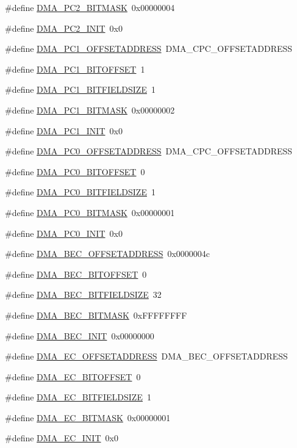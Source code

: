 \begin{DoxyCompactItemize}
\item 
\#define \hyperlink{a00547_a8bc6bf603200c5576041f5efb1bbb3fa}{DMA\_\-PC2\_\-BITMASK}~0x00000004
\item 
\#define \hyperlink{a00547_ae8f8f5cafa7cb5a3432330f6bd7c8545}{DMA\_\-PC2\_\-INIT}~0x0
\item 
\#define \hyperlink{a00547_a5bcf743628bf5a288525da9914231160}{DMA\_\-PC1\_\-OFFSETADDRESS}~DMA\_\-CPC\_\-OFFSETADDRESS
\item 
\#define \hyperlink{a00547_ab5d5d1413dcb4e0e265b75527d54b991}{DMA\_\-PC1\_\-BITOFFSET}~1
\item 
\#define \hyperlink{a00547_adc953b9a63b8aea304f5fd3c5a5b37c1}{DMA\_\-PC1\_\-BITFIELDSIZE}~1
\item 
\#define \hyperlink{a00547_a4aba948f4d1d8fbb5a006d0c6fd04f9c}{DMA\_\-PC1\_\-BITMASK}~0x00000002
\item 
\#define \hyperlink{a00547_afc2289327605fe02ebfeb946919fe5b5}{DMA\_\-PC1\_\-INIT}~0x0
\item 
\#define \hyperlink{a00547_a92fb05b33dcfaa49dc3e177695413b2f}{DMA\_\-PC0\_\-OFFSETADDRESS}~DMA\_\-CPC\_\-OFFSETADDRESS
\item 
\#define \hyperlink{a00547_a3d27bc23ca5e54a254421a73b26cdb19}{DMA\_\-PC0\_\-BITOFFSET}~0
\item 
\#define \hyperlink{a00547_aea542224fcd0fbadd5ab1ee3094c85da}{DMA\_\-PC0\_\-BITFIELDSIZE}~1
\item 
\#define \hyperlink{a00547_aba1f7f5aa23a474f5887516c98b26563}{DMA\_\-PC0\_\-BITMASK}~0x00000001
\item 
\#define \hyperlink{a00547_a8452ecb69e450977ef4360e923801cf6}{DMA\_\-PC0\_\-INIT}~0x0
\item 
\#define \hyperlink{a00547_ad80e0c9431c46cb3e1fde5b2297b8ed1}{DMA\_\-BEC\_\-OFFSETADDRESS}~0x0000004c
\item 
\#define \hyperlink{a00547_a57a67b1d0edc6422548771bdbc019af8}{DMA\_\-BEC\_\-BITOFFSET}~0
\item 
\#define \hyperlink{a00547_a5ae1e4fd1ad40538223e030c5e7c4f70}{DMA\_\-BEC\_\-BITFIELDSIZE}~32
\item 
\#define \hyperlink{a00547_a2becfaea83418cc2f99c46ebf387894f}{DMA\_\-BEC\_\-BITMASK}~0xFFFFFFFF
\item 
\#define \hyperlink{a00547_acf064bbaf030b22a8b1f9945eb74dfd0}{DMA\_\-BEC\_\-INIT}~0x00000000
\item 
\#define \hyperlink{a00547_a39e33436d3c28d4a8b7d8e7072520a5b}{DMA\_\-EC\_\-OFFSETADDRESS}~DMA\_\-BEC\_\-OFFSETADDRESS
\item 
\#define \hyperlink{a00547_acc506476718b2cfe23271dbe3e44ce65}{DMA\_\-EC\_\-BITOFFSET}~0
\item 
\#define \hyperlink{a00547_ada973e36f7e38a6d9edca0e71196aba6}{DMA\_\-EC\_\-BITFIELDSIZE}~1
\item 
\#define \hyperlink{a00547_a41f64ebe1a7720a097009d1cac847137}{DMA\_\-EC\_\-BITMASK}~0x00000001
\item 
\#define \hyperlink{a00547_ada87a117788b6d9d5533d8e95d32a971}{DMA\_\-EC\_\-INIT}~0x0
\end{DoxyCompactItemize}


